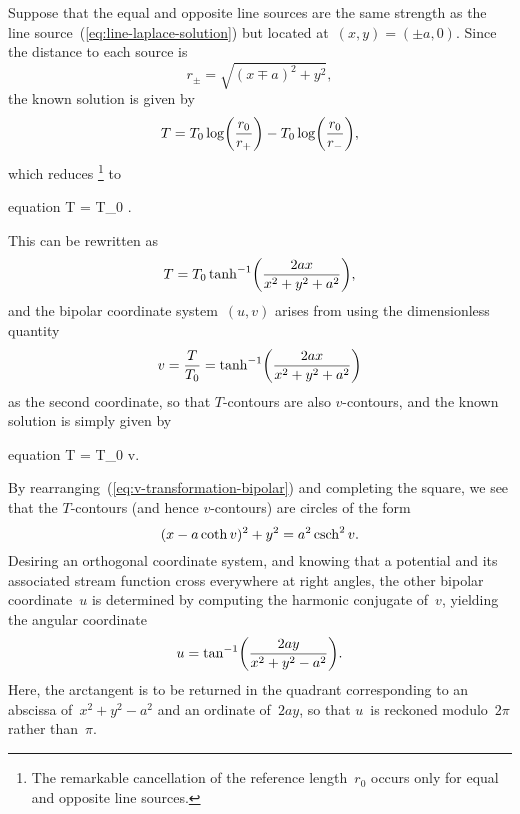 Suppose that the equal and opposite line sources
are the same strength as the line source~(\ref{eq:line-laplace-solution})
but located at~$(x, y) = (\pm a, 0)$.
Since the distance to each source is
\begin{equation}
  r_\pm = \sqrt{(x \mp a)^2 + y^2},
  \label{eq:bipolar-source-distances}
\end{equation}
the known solution is given by
\begin{equation}
  T =
    T_0 \log \roundbr*{\frac{r_0}{r_+}}
      -
    T_0 \log \roundbr*{\frac{r_0}{r_-}},
  \label{eq:bipolar-laplace-solution-terms}
\end{equation}
which reduces%
\footnote{
  The remarkable cancellation of the reference length~$r_0$
  occurs only for equal and opposite line sources.
}
to
\begin{important}{equation}
  T = T_0 \log {}.
  \label{eq:bipolar-laplace-solution-source-distances}
\end{important}
This can be rewritten as
\begin{equation}
  T = T_0 \tanh^{-1} \roundbr*{\frac{2 a x}{x^2 + y^2 + a^2}},
  \label{eq:bipolar-laplace-solution-inverse-tanh}
\end{equation}
and the bipolar coordinate system~$(u, v)$ arises
from using the dimensionless quantity
\begin{equation}
  v
    = \frac{T}{T_0}
    = \tanh^{-1} \roundbr*{\frac{2 a x}{x^2 + y^2 + a^2}}
  \label{eq:v-transformation-bipolar}
\end{equation}
as the second coordinate,
so that $T$-contours are also $v$-contours,
and the known solution is simply given by
\begin{important}{equation}
  T = T_0 \cdot v.
  \label{eq:bipolar-laplace-solution}
\end{important}
By rearranging~(\ref{eq:v-transformation-bipolar}) and completing the square,
we see that the $T$-contours (and hence $v$-contours) are circles of the form
\begin{equation}
  (x - a \coth v)^2 + y^2 = a^2 \operatorname{csch}^2 v.
  \label{eq:bipolar-circle-v}
\end{equation}
Desiring an orthogonal coordinate system,
and knowing that a potential and its associated stream function
cross everywhere at right angles,
the other bipolar coordinate~$u$ is determined by computing
the harmonic conjugate of~$v$,
yielding the angular coordinate
\begin{equation}
  u = \tan^{-1} \roundbr*{\frac{2 a y}{x^2 + y^2 - a^2}}.
  \label{eq:u-transformation-bipolar}
\end{equation}
Here, the arctangent is to be returned in the quadrant corresponding to
an abscissa of~$x^2 + y^2 - a^2$ and an ordinate of~$2 a y$,
so that $u$~is reckoned modulo~$2 \pi$ rather than~$\pi$.

